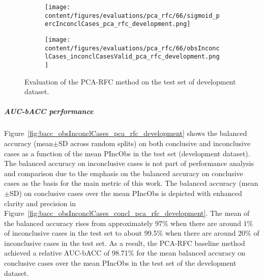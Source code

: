 \begin{figure}[ht]
  \begin{subfigure}{0.48\textwidth}
    \centering
    \texttt{[image: content/figures/evaluations/pca\_rfc/66/sigmoid\_percInconclCases\_pca\_rfc\_development.png]}
    \label{fig:pca_rfc_percInconclCases_development}
  \end{subfigure}
  \hfill
  \begin{subfigure}{0.495\textwidth}
    \centering
    \texttt{[image: content/figures/evaluations/pca\_rfc/66/obsInconclCases\_inconclCasesValid\_pca\_rfc\_development.png]}
    \label{fig:obsInconclCases_inconclCasesValid_pca_rfc_development}
  \end{subfigure}

  \caption{Evaluation of the PCA-RFC method on the test set of development dataset.}
  \label{fig:pca_rfc_dev_fig}
\end{figure}


\subparagraph{AUC-bACC performance}

Figure~\ref{fig:bacc_obsInconclCases_pca_rfc_development} shows the balanced accuracy (mean$\pm$SD across random splits) 
on both conclusive and inconclusive cases as a function of the mean PIncObs
in the test set (development dataset).
The balanced accuracy on inconclusive cases is not part of performance analysis and comparison 
due to the emphasis on the balanced accuracy on conclusive cases as the basis for the main metric of this work.
The balanced accuracy (mean$\pm$SD) on conclusive cases over the mean PIncObs
is depicted with enhanced clarity and precision in Figure~\ref{fig:bacc_obsInconclCases_concl_pca_rfc_development}.
The mean of the balanced accuracy rises from approximately 97\% 
when there are around 1\% of inconclusive cases in the test set to about 99.5\% 
when there are around 20\% of inconclusive cases in the test set.
As a result, the PCA-RFC baseline method achieved a relative AUC-bACC of 98.71\% for the mean balanced accuracy on conclusive cases
over the mean PIncObs in the test set of the development dataset.


